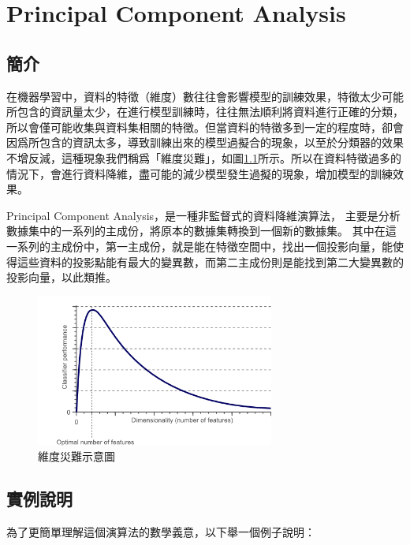 \chapter{Principal Component Analysis}
\label{chapter:pca}
\section{簡介}
\label{sec:background}


在機器學習中，資料的特徵（維度）數往往會影響模型的訓練效果，特徵太少可能所包含的資訊量太少，在進行模型訓練時，往往無法順利將資料進行正確的分類，所以會僅可能收集與資料集相關的特徵。但當資料的特徵多到一定的程度時，卻會因爲所包含的資訊太多，導致訓練出來的模型過擬合的現象，以至於分類器的效果不增反減，這種現象我們稱爲「維度災難」，如圖\ref{fig:curse_of_dimesionality}所示。所以在資料特徵過多的情況下，會進行資料降維，盡可能的減少模型發生過擬的現象，增加模型的訓練效果。

Principal Component Analysis，是一種非監督式的資料降維演算法，
主要是分析數據集中的一系列的主成份，將原本的數據集轉換到一個新的數據集。
其中在這一系列的主成份中，第一主成份，就是能在特徵空間中，找出一個投影向量，能使得這些資料的投影點能有最大的變異數，而第二主成份則是能找到第二大變異數的投影向量，以此類推。




\begin{figure}[h]
	\centering
	\includegraphics[height=5cm]{./pic/NZgacRXF.png}
	\caption{維度災難示意圖}
	\label{fig:curse_of_dimesionality}
\end{figure}


\section{實例說明}
為了更簡單理解這個演算法的數學義意，以下舉一個例子說明：



